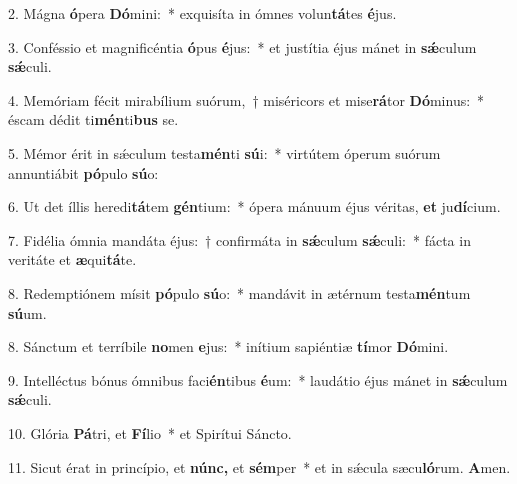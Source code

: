 \item 2. Mágna \textbf{ó}pera \textbf{Dó}mini:~* exquisíta in ómnes volun\textbf{tá}tes \textbf{é}jus.

\item 3. Conféssio et magnificéntia \textbf{ó}pus \textbf{é}jus:~* et justítia éjus mánet in \textbf{sǽ}culum \textbf{sǽ}culi.

\item 4. Memóriam fécit mirabílium suórum,~† miséricors et mise\textbf{rá}tor \textbf{Dó}minus:~* éscam dédit ti\textbf{mén}ti\textbf{bus} se.

\item 5. Mémor érit in sǽculum testa\textbf{mén}ti \textbf{sú}i:~* virtútem óperum suórum annuntiábit \textbf{pó}pulo \textbf{sú}o:

\item 6. Ut det íllis heredi\textbf{tá}tem \textbf{gén}tium:~* ópera mánuum éjus véritas, \textbf{et} ju\textbf{dí}cium.

\item 7. Fidélia ómnia mandáta éjus:~† confirmáta in \textbf{sǽ}culum \textbf{sǽ}culi:~* fácta in veritáte et \textbf{æ}qui\textbf{tá}te.

\item 8. Redemptiónem mísit \textbf{pó}pulo \textbf{sú}o:~* mandávit in ætérnum testa\textbf{mén}tum \textbf{sú}um.

\item 8. Sánctum et terríbile \textbf{no}men \textbf{e}jus:~* inítium sapiéntiæ \textbf{tí}mor \textbf{Dó}mini.

\item 9. Intelléctus bónus ómnibus faci\textbf{én}tibus \textbf{é}um:~* laudátio éjus mánet in \textbf{sǽ}culum \textbf{sǽ}culi.

\item 10. Glória \textbf{Pá}tri, et \textbf{Fí}lio~* et Spirítui Sáncto.

\item 11. Sicut érat in princípio, et \textbf{núnc,} et \textbf{sém}per~* et in sǽcula sæcu\textbf{ló}rum. \textbf{A}men.